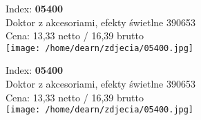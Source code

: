 {Index: \textbf{05400}\\
Doktor z akcesoriami, efekty świetlne 390653\\
Cena: 13,33 netto / 16,39 brutto\\
  \texttt{[image: /home/dearn/zdjecia/05400.jpg]}}\newline\newline

{Index: \textbf{05400}\\
Doktor z akcesoriami, efekty świetlne 390653\\
Cena: 13,33 netto / 16,39 brutto\\
  \texttt{[image: /home/dearn/zdjecia/05400.jpg]}}\newline\newline
